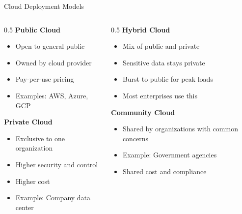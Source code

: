 \documentclass[aspectratio=169,12pt]{beamer}
\begin{document}
\begin{frame}{Cloud Deployment Models}
    \begin{columns}
        \begin{column}{0.5\textwidth}
            \textbf{Public Cloud}
            \begin{itemize}
                \item Open to general public
                \item Owned by cloud provider
                \item Pay-per-use pricing
                \item Examples: AWS, Azure, GCP
            \end{itemize}
            
            \vspace{0.3cm}
            \textbf{Private Cloud}
            \begin{itemize}
                \item Exclusive to one organization
                \item Higher security and control
                \item Higher cost
                \item Example: Company data center
            \end{itemize}
        \end{column}
        \begin{column}{0.5\textwidth}
            \textbf{Hybrid Cloud}
            \begin{itemize}
                \item Mix of public and private
                \item Sensitive data stays private
                \item Burst to public for peak loads
                \item Most enterprises use this
            \end{itemize}
            
            \vspace{0.3cm}
            \textbf{Community Cloud}
            \begin{itemize}
                \item Shared by organizations with common concerns
                \item Example: Government agencies
                \item Shared cost and compliance
            \end{itemize}
        \end{column}
    \end{columns}
\end{frame}
\end{document}
